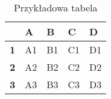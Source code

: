 \begin{table}[htbp]
\centering
\begin{tabular}{|l|l|l|l|l|}
\hline
\textbf{}  & \textbf{A} & \textbf{B} & \textbf{C} & \textbf{D} \\ \hline
\textbf{1} & A1         & B1         & C1         & D1         \\ \hline
\textbf{2} & A2         & B2         & C2         & D2         \\ \hline
\textbf{3} & A3         & B3         & C3         & D3         \\ \hline
\end{tabular}
\caption{Przykładowa tabela}
\label{tab:przykladowa_tabela}
\end{table}